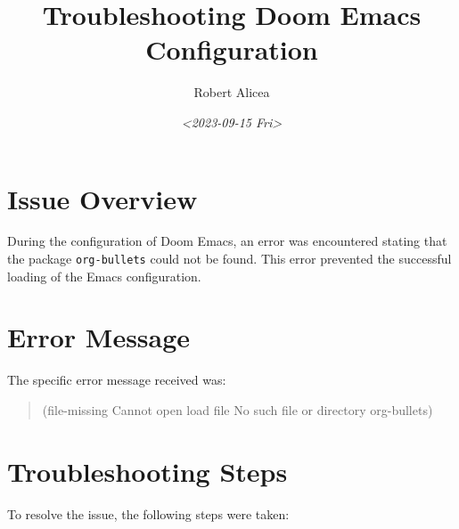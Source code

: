 \documentclass[11pt]{article}
\author{Robert Alicea}
\date{\textit{<2023-09-15 Fri>}}
\title{Troubleshooting Doom Emacs Configuration}
\begin{document}
\maketitle
\tableofcontents


\section{Issue Overview}
\label{sec:orgf599d74}
During the configuration of Doom Emacs, an error was encountered stating that the package \texttt{org-bullets} could not be found. This error prevented the successful loading of the Emacs configuration.

\section{Error Message}
\label{sec:org2f01dcb}
The specific error message received was:
\begin{quote}
(file-missing Cannot open load file No such file or directory org-bullets)
\end{quote}

\section{Troubleshooting Steps}
\label{sec:org448c85f}
To resolve the issue, the following steps were taken:
\end{document}
